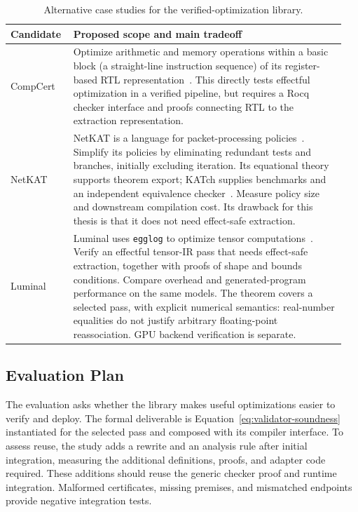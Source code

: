 \begin{table}[htbp]
  \centering
  \begin{tabular}{@{}p{0.17\linewidth}p{0.78\linewidth}@{}}
    \toprule
    Candidate & Proposed scope and main tradeoff \\
    \midrule
    CompCert &
    Optimize arithmetic and memory operations within a basic block
      (a straight-line instruction sequence) of its register-based RTL representation~\cite{compcert-doc}.
    This directly tests effectful optimization in a verified pipeline,
      but requires a Rocq checker interface and proofs connecting RTL to the extraction representation. \\[6pt]
    NetKAT &
    NetKAT is a language for packet-processing policies~\cite{netkat}.
    Simplify its policies by eliminating redundant tests and branches, initially excluding iteration.
    Its equational theory supports theorem export; KATch supplies benchmarks and an independent
      equivalence checker~\cite{katch}.
    Measure policy size and downstream compilation cost.
    Its drawback for this thesis is that it does not need effect-safe extraction. \\[6pt]
    Luminal &
    Luminal uses \texttt{egglog} to optimize tensor computations~\cite{luminal,luminal-megakernels}.
    Verify an effectful tensor-IR pass that needs effect-safe extraction,
      together with proofs of shape and bounds conditions.
    Compare overhead and generated-program performance on the same models.
    The theorem covers a selected pass, with explicit numerical semantics:
      real-number equalities do not justify arbitrary floating-point reassociation.
    GPU backend verification is separate. \\
    \bottomrule
  \end{tabular}
  \caption{Alternative case studies for the verified-optimization library.}
  \label{tab:compiler-cases}
\end{table}

\subsection{Evaluation Plan}
\label{sec:evaluation}

The evaluation asks whether the library makes useful optimizations easier to verify and deploy.
The formal deliverable is Equation~\ref{eq:validator-soundness}
  instantiated for the selected pass and composed with its compiler interface.
To assess reuse, the study adds a rewrite and an analysis rule after initial integration,
  measuring the additional definitions, proofs, and adapter code required.
These additions should reuse the generic checker proof and runtime integration.
Malformed certificates, missing premises, and mismatched endpoints provide negative integration tests.

